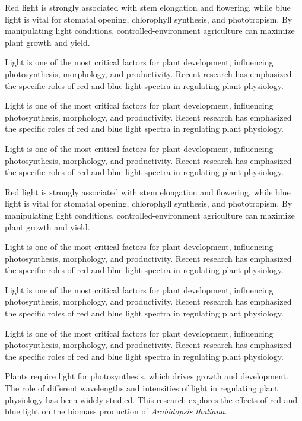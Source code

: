 \documentclass[10pt]{article} %
\begin{document}
\begin{multicols}{2}
Red light is strongly associated with stem elongation and flowering, while blue light is vital for stomatal opening, chlorophyll synthesis, and phototropism. By manipulating light conditions, controlled-environment agriculture can maximize plant growth and yield.

Light is one of the most critical factors for plant development, influencing photosynthesis, morphology, and productivity. Recent research has emphasized the specific roles of red and blue light spectra in regulating plant physiology.

Light is one of the most critical factors for plant development, influencing photosynthesis, morphology, and productivity. Recent research has emphasized the specific roles of red and blue light spectra in regulating plant physiology.

Light is one of the most critical factors for plant development, influencing photosynthesis, morphology, and productivity. Recent research has emphasized the specific roles of red and blue light spectra in regulating plant physiology.

Red light is strongly associated with stem elongation and flowering, while blue light is vital for stomatal opening, chlorophyll synthesis, and phototropism. By manipulating light conditions, controlled-environment agriculture can maximize plant growth and yield.

Light is one of the most critical factors for plant development, influencing photosynthesis, morphology, and productivity. Recent research has emphasized the specific roles of red and blue light spectra in regulating plant physiology.

Light is one of the most critical factors for plant development, influencing photosynthesis, morphology, and productivity. Recent research has emphasized the specific roles of red and blue light spectra in regulating plant physiology.

Light is one of the most critical factors for plant development, influencing photosynthesis, morphology, and productivity. Recent research has emphasized the specific roles of red and blue light spectra in regulating plant physiology.

Plants require light for photosynthesis, which drives growth and development. The role of different wavelengths and intensities of light in regulating plant physiology has been widely studied. This research explores the effects of red and blue light on the biomass production of \textit{Arabidopsis thaliana}.



\end{multicols}
\end{document}

